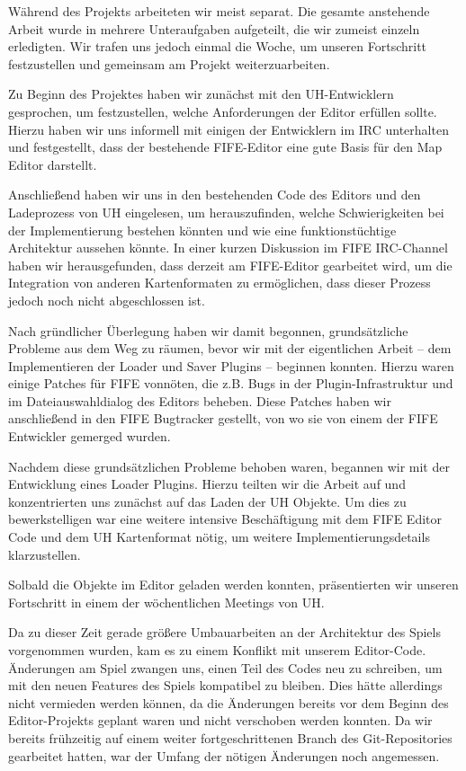 Während des Projekts arbeiteten wir meist separat. Die gesamte anstehende
Arbeit wurde in mehrere Unteraufgaben aufgeteilt, die wir zumeist einzeln
erledigten. Wir trafen uns jedoch einmal die Woche, um unseren Fortschritt festzustellen
und gemeinsam am Projekt weiterzuarbeiten.

Zu Beginn des Projektes haben wir zunächst mit den UH-Entwicklern gesprochen,
um festzustellen, welche Anforderungen der Editor erfüllen sollte. Hierzu
haben wir uns informell mit einigen der Entwicklern im IRC unterhalten und
festgestellt, dass der bestehende FIFE-Editor eine gute Basis für den Map
Editor darstellt.

Anschließend haben wir uns in den bestehenden Code des Editors und den Ladeprozess
von UH eingelesen, um herauszufinden, welche Schwierigkeiten bei der Implementierung
bestehen könnten und wie eine funktionstüchtige Architektur aussehen könnte.
In einer kurzen Diskussion im FIFE IRC-Channel haben wir herausgefunden, dass
derzeit am FIFE-Editor gearbeitet wird, um die Integration von anderen Kartenformaten
zu ermöglichen, dass dieser Prozess jedoch noch nicht abgeschlossen ist.

Nach gründlicher Überlegung haben wir damit begonnen, grundsätzliche Probleme aus
dem Weg zu räumen, bevor wir mit der eigentlichen Arbeit -- dem Implementieren
der Loader und Saver Plugins -- beginnen konnten. Hierzu waren einige Patches für
FIFE vonnöten, die z.B. Bugs in der Plugin-Infrastruktur und im Dateiauswahldialog
des Editors beheben. Diese Patches haben wir anschließend in den FIFE Bugtracker
gestellt, von wo sie von einem der FIFE Entwickler gemerged wurden.

Nachdem diese grundsätzlichen Probleme behoben waren, begannen wir mit der Entwicklung
eines Loader Plugins. Hierzu teilten wir die Arbeit auf und konzentrierten uns zunächst
auf das Laden der UH Objekte. Um dies zu bewerkstelligen war eine weitere intensive Beschäftigung
mit dem FIFE Editor Code und dem UH Kartenformat nötig, um weitere Implementierungsdetails
klarzustellen.

Solbald die Objekte im Editor geladen werden konnten, präsentierten wir unseren Fortschritt
in einem der wöchentlichen Meetings von UH.

Da zu dieser Zeit gerade größere Umbauarbeiten an der Architektur des Spiels vorgenommen wurden,
kam es zu einem Konflikt mit unserem Editor-Code. Änderungen am Spiel zwangen uns, einen Teil
des Codes neu zu schreiben, um mit den neuen Features des Spiels kompatibel zu bleiben. Dies
hätte allerdings nicht vermieden werden können, da die Änderungen bereits vor dem Beginn des
Editor-Projekts geplant waren und nicht verschoben werden konnten. Da wir bereits frühzeitig
auf einem weiter fortgeschrittenen Branch des Git-Repositories gearbeitet hatten, war der
Umfang der nötigen Änderungen noch angemessen.

